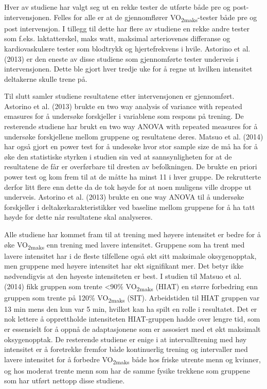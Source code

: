 \documentclass[
  letterpaper,
  DIV=11,
  numbers=noendperiod]{scrartcl}
\begin{document}
Hver av studiene har valgt seg ut en rekke tester de utførte både pre og
post-intervensjonen. Felles for alle er at de gjennomflører
VO\textsubscript{2maks}-tester både pre og post intervensjon. I tillegg
til dette har flere av studiene en rekke andre tester som f.eks.
laktatterskel, maks watt, maksimal arteriovenøs differanse og
kardiovaskulære tester som blodtrykk og hjertefrekvens i hvile. Astorino
et al. (2013) er den eneste av disse studiene som gjennomførte tester
underveis i intervensjonen. Dette ble gjort hver tredje uke for å regne
ut hvilken intensitet deltakerne skulle trene på.

Til slutt samler studiene resultatene etter intervensjonen er
gjennomført. Astorino et al. (2013) brukte en two way analysis of
variance with repeated emasures for å undersøke forskjeller i variablene
som respons på trening. De resterende studiene har brukt en two way
ANOVA with repeated measures for å undersøke forskjellene mellom
gruppene og resultatene deres. Matsuo et al. (2014) har også gjort en
power test for å undesøke hvor stor sample size de må ha for å øke den
statistiske styrken i studien sin ved at sannsynligheten for at de
resultatene de får er overførbare til dresten av befolkningen. De brukte
en priori power test og kom frem til at de måtte ha minst 11 i hver
gruppe. De rekrutterte derfor litt flere enn dette da de tok høyde for
at noen muligens ville droppe ut underveis. Astorino et al. (2013)
brukte en one way ANOVA til å undersøke forskjeller i
deltakerkarakteristikker ved baseline mellom gruppene for å ha tatt
høyde for dette når resultatene skal analyseres.

Alle studiene har kommet fram til at trening med høyere intensitet er
bedre for å øke VO\textsubscript{2maks} enn trening med lavere
intensitet. Gruppene som ha trent med lavere intensitet har i de fleste
tilfellene også økt sitt maksimale oksygenopptak, men gruppene med
høyere intensitet har økt signifikant mer. Det betyr ikke nødvendigvis
at den høyeste intensiteten er best. I studien til Matsuo et al. (2014)
fikk gruppen som trente \textless90\% VO\textsubscript{2maks} (HIAT) en
større forbedring enn gruppen som trente på 120\%
VO\textsubscript{2maks} (SIT). Arbeidstiden til HIAT gruppen var 13 min
mens den kun var 5 min, hvilket kan ha spilt en rolle i resultatet. Det
er nok lettere å opprettholde intensiteten HIAT-gruppen hadde over
lengre tid, som er essensielt for å oppnå de adaptasjonene som er
assosiert med et økt maksimalt oksygenopptak. De resterende studiene er
enige i at intervalltrening med høy intensitet er å foretrekke fremfor
både kontinuerlig trening og intervaller med lavere intensitet for å
forbedre VO\textsubscript{2maks} både hos friske utrente menn og
kvinner, og hos moderat trente menn som har de samme fysike trekkene som
gruppene som har utført nettopp disse studiene.
\end{document}
